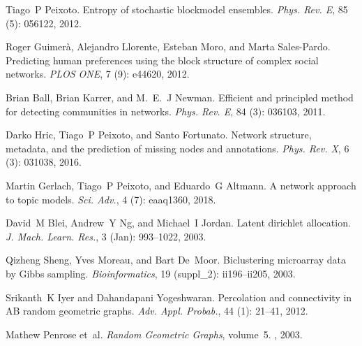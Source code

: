 Tiago~P Peixoto.
\newblock Entropy of stochastic blockmodel ensembles.
\newblock \emph{Phys. Rev. E}, 85 (5): 056122, 2012.

Roger Guimer{\`a}, Alejandro Llorente, Esteban Moro, and Marta {Sales-Pardo}.
\newblock Predicting human preferences using the block structure of complex
social networks.
\newblock \emph{PLOS ONE}, 7 (9): e44620, 2012.

Brian Ball, Brian Karrer, and M.~E.~J Newman.
\newblock Efficient and principled method for detecting communities in
networks.
\newblock \emph{Phys. Rev. E}, 84 (3): 036103, 2011.

Darko Hric, Tiago~P Peixoto, and Santo Fortunato.
\newblock Network structure, metadata, and the prediction of missing nodes and
annotations.
\newblock \emph{Phys. Rev. X}, 6 (3): 031038, 2016.

Martin Gerlach, Tiago~P Peixoto, and Eduardo~G Altmann.
\newblock A network approach to topic models.
\newblock \emph{Sci. Adv.}, 4 (7): eaaq1360, 2018.

David~M Blei, Andrew~Y Ng, and Michael~I Jordan.
\newblock Latent dirichlet allocation.
\newblock \emph{J. Mach. Learn. Res.}, 3 (Jan): 993--1022,
2003.

Qizheng Sheng, Yves Moreau, and Bart De~Moor.
\newblock Biclustering microarray data by {{Gibbs}} sampling.
\newblock \emph{Bioinformatics}, 19 (suppl\_2): ii196--ii205,
2003.

Srikanth~K Iyer and Dahandapani Yogeshwaran.
\newblock Percolation and connectivity in {{AB}} random geometric graphs.
\newblock \emph{Adv. Appl. Probab.}, 44 (1): 21--41, 2012.

Mathew Penrose et~al.
\newblock \emph{Random Geometric Graphs}, volume~5.
, 2003.


